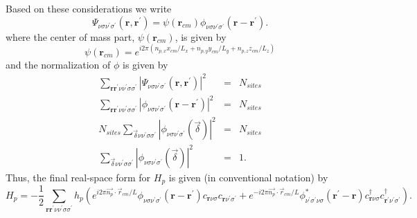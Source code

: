Based on these considerations we write
\begin{equation}
\Psi_{\nu\sigma\nu^{\prime}\sigma^{\prime}}(\mathbf{r},\mathbf{r}^{\prime}) = 
\psi\left(\mathbf{r}_{cm}\right) 
\phi_{\nu\sigma\nu^{\prime}\sigma^{\prime}}(\mathbf{r} - \mathbf{r}^{\prime}).
\end{equation}
where the center of mass part, $\psi(\mathbf{r}_{cm})$, is given
by
\begin{equation}
\psi(\mathbf{r}_{cm}) = e^{i 2 \pi ( n_{p,x} x_{cm} / L_x + n_{p,y} y_{cm}/L_y + 
n_{p,z} z_{cm}/L_z)}
\end{equation}
and the normalization of $\phi$ is given by
\begin{eqnarray}
\sum_{\mathbf{r}\mathbf{r}^{\prime}\nu\nu^{\prime}\sigma\sigma^{\prime}} 
|\Psi_{\nu\sigma\nu^{\prime}\sigma^{\prime}}(\mathbf{r},\mathbf{r}^{\prime})|^2 
& = & N_{sites} \\
\sum_{\mathbf{r}\mathbf{r}^{\prime}\nu\nu^{\prime}\sigma\sigma^{\prime}} 
|\phi_{\nu\sigma\nu^{\prime}\sigma^{\prime}}(\mathbf{r} - \mathbf{r}^{\prime}) |^2 
& = & N_{sites} \\
N_{sites} \sum_{\vec{\delta}\nu\nu^{\prime}\sigma\sigma^{\prime}} 
|\phi_{\nu\sigma\nu^{\prime}\sigma^{\prime}}(\vec{\delta})|^2 & = & 
N_{sites} \\
\sum_{\vec{\delta}\nu\nu^{\prime}\sigma\sigma^{\prime}} 
|\phi_{\nu\sigma\nu^{\prime}\sigma^{\prime}}(\vec{\delta}) |^2 & = & 1.
\end{eqnarray}
Thus, the final real-space form for $H_p$ is given (in conventional
notation) by
\begin{equation}
\label{H_p_real}
H_p = -\frac{1}{2}
\sum_{\mathbf{r}\mathbf{r}^{\prime}\nu\nu^{\prime}\sigma\sigma^{\prime}} 
 h_p \left(e^{i 2 \pi \vec{n_p}\cdot \vec{r}_{cm}/L} 
\phi_{\nu\sigma\nu^{\prime}\sigma^{\prime}}(\mathbf{r} -
\mathbf{r}^{\prime}) c_{\mathbf{r}\nu\sigma} c_{\mathbf{r}\nu^{\prime}\sigma^{\prime}}
+e^{-i 2 \pi \vec{n_p}\cdot \vec{r}_{cm}/L} 
\phi_{\nu^{\prime}\sigma^{\prime}\nu\sigma}^*(\mathbf{r}^{\prime} -
\mathbf{r})c^{\dagger}_{\mathbf{r}\nu\sigma}
c^{\dagger}_{\mathbf{r}^{\prime}\nu^{\prime}\sigma^{\prime}} \right).
\end{equation}

